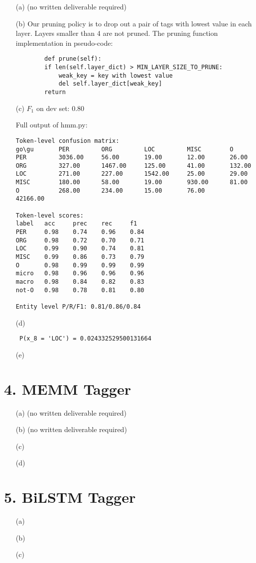\documentclass{article}
\begin{document}
\begin{itemize}
    \item[(a)] (no written deliverable required)
    \item[(b)] Our pruning policy is to drop out a pair of tags with lowest value in each layer. Layers smaller than 4 are not pruned. The pruning function implementation in pseudo-code:
    \begin{verbatim}
        def prune(self):
        if len(self.layer_dict) > MIN_LAYER_SIZE_TO_PRUNE:
            weak_key = key with lowest value
            del self.layer_dict[weak_key]
        return
    \end{verbatim}
   
    \item[(c)] $F_1$ on dev set: 0.80
    
    Full output of hmm.py:

    \begin{verbatim}
Token-level confusion matrix:
go\gu   	PER     	ORG     	LOC     	MISC    	O       
PER     	3036.00 	56.00   	19.00   	12.00   	26.00   
ORG     	327.00  	1467.00 	125.00  	41.00   	132.00  
LOC     	271.00  	227.00  	1542.00 	25.00   	29.00   
MISC    	180.00  	58.00   	19.00   	930.00  	81.00   
O       	268.00  	234.00  	15.00   	76.00   	42166.00

Token-level scores:
label	acc  	prec 	rec  	f1   
PER  	0.98 	0.74 	0.96 	0.84 
ORG  	0.98 	0.72 	0.70 	0.71 
LOC  	0.99 	0.90 	0.74 	0.81 
MISC 	0.99 	0.86 	0.73 	0.79 
O    	0.98 	0.99 	0.99 	0.99 
micro	0.98 	0.96 	0.96 	0.96 
macro	0.98 	0.84 	0.82 	0.83 
not-O	0.98 	0.78 	0.81 	0.80 

Entity level P/R/F1: 0.81/0.86/0.84
    \end{verbatim}

    \item[(d)] \begin{verbatim} P(x_8 = 'LOC') = 0.024332529500131664 \end{verbatim}
    \item[(e)]
\end{itemize}

\section*{4. MEMM Tagger}

\begin{itemize}
    \item[(a)] (no written deliverable required)
    \item[(b)] (no written deliverable required)
    \item[(c)]
    \item[(d)] 
\end{itemize}

\section*{5. BiLSTM Tagger}

\begin{itemize}
    \item[(a)]
    \item[(b)]
    \item[(c)]
\end{itemize}
\end{document}
